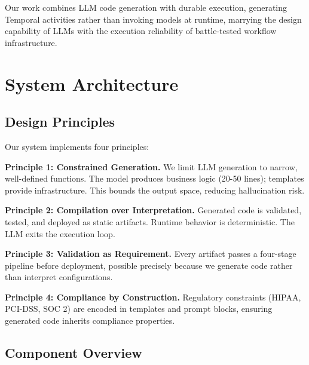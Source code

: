\documentclass[11pt]{article}
\begin{document}
Our work combines LLM code generation with durable execution, generating Temporal activities rather than invoking models at runtime, marrying the design capability of LLMs with the execution reliability of battle-tested workflow infrastructure.

\section{System Architecture}
\label{sec:architecture}

\subsection{Design Principles}

Our system implements four principles:

\textbf{Principle 1: Constrained Generation.} We limit LLM generation to narrow, well-defined functions. The model produces business logic (20-50 lines); templates provide infrastructure. This bounds the output space, reducing hallucination risk.

\textbf{Principle 2: Compilation over Interpretation.} Generated code is validated, tested, and deployed as static artifacts. Runtime behavior is deterministic. The LLM exits the execution loop.

\textbf{Principle 3: Validation as Requirement.} Every artifact passes a four-stage pipeline before deployment, possible precisely because we generate code rather than interpret configurations.

\textbf{Principle 4: Compliance by Construction.} Regulatory constraints (HIPAA, PCI-DSS, SOC 2) are encoded in templates and prompt blocks, ensuring generated code inherits compliance properties.

\subsection{Component Overview}
\end{document}
